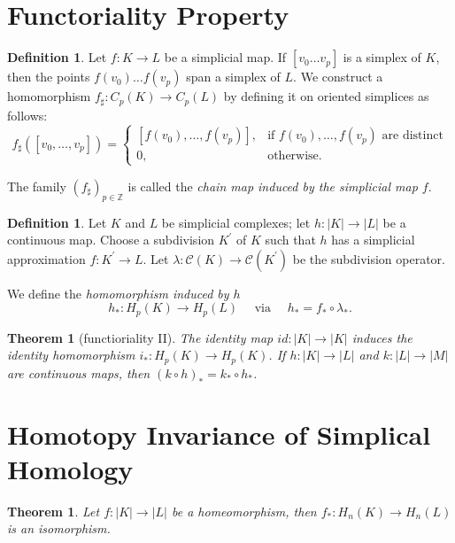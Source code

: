 \documentclass[a4paper,DIV12,10pt]{scrartcl}
\newcommand{\Z}{\ensuremath{\mathbb{Z}}}   %
\newtheorem{theorem}[satz]{Theorem}
\theoremstyle{definition}
\newtheorem{definition}[satz]{Definition}
\begin{document}
\section{Functoriality Property}
\begin{definition}
	Let $f: K\to L$ be a simplicial map. If $[v_0\dots v_p]$ is a simplex of $K$, then the points $f(v_0)\dots f(v_p)$ span a simplex of $L$. We construct a homomorphism $f_\sharp: C_p(K)\to C_p(L)$ by defining it on oriented simplices as follows:
	\[
	f_\sharp([v_0,\dots,v_p])=\begin{cases}
	[f(v_0),\dots, f(v_p)],& \text{if } f(v_0),\dots, f(v_p) \text{ are distinct}\\
	0,&\text{otherwise}.
	\end{cases}
	\]
	
	The family $(f_\sharp)_{p\in\Z}$ is called the \textit{chain map induced by the simplicial map $f$}.
	
\end{definition}
\begin{definition}
	Let $K$ and $L$ be simplicial complexes; let $h:|K|\to |L|$ be a continuous map. Choose a subdivision $K^\prime$ of $K$ such that $h$ has a simplicial approximation $f:K^\prime\to L$. Let $\lambda:\mathcal{C}(K)\to \mathcal{C}(K^\prime)$ be the subdivision operator.
	
	We define the \textit{homomorphism induced by $h$} 
	\[
	h_\ast: H_p(K)\to H_p(L) \quad \text{ via }\quad 
	h_\ast=f_\ast\circ \lambda_\ast.
	\]
\end{definition}
\begin{theorem}[functioriality II]
The identity map $id: |K|\to |K|$ induces the identity homomorphism $i_\ast: H_p(K)\to H_p(K)$. If $h:|K|\to|L|$ and $k:|L|\to |M|$ are continuous maps, then $(k\circ h)_\ast=k_\ast\circ h_\ast$.
\end{theorem}

\section{Homotopy Invariance of Simplical Homology}

\begin{theorem}
	Let $f: |K|\to |L| $ be a homeomorphism, then $f_\ast: H_n(K)\to H_n(L)$ is an isomorphism.
\end{theorem}
\end{document}
